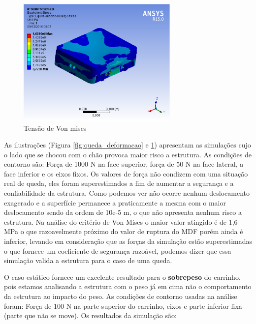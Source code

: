 \begin{figure}[H]
    \centering
    \includegraphics[width=0.7\textwidth]{figuras/queda_von.eps}
    \caption{Tensão de Von mises}
    \label{fig:queda_von}
\end{figure}

As ilustrações (Figura \ref{fig:queda_deformacao} e \ref{fig:queda_von}) apresentam as simulações cujo o lado que se chocou com o chão provoca
maior risco a estrutura. As condições de contorno são: Força de 1000 N na face superior, força de 50 N na face lateral, a face inferior e os
eixos fixos. Os valores de força não condizem com uma situação real de queda, eles foram superestimados a fim de aumentar a segurança e a
confiabilidade da estrutura. Como podemos ver não ocorre nenhum deslocamento exagerado e a superfície permanece a praticamente a mesma com
o maior deslocamento sendo da ordem de 10e-5 m, o que não apresenta nenhum risco a estrutura. Na análise do critério de Von Mises o maior
valor atingido é de 1,6 MPa o que razoavelmente próximo do valor de ruptura do MDF porém ainda é inferior, levando em consideração que as
forças da simulação estão superestimadas o que fornece um coeficiente de segurança razoável, podemos dizer que essa simulação valida a
estrutura para o caso de uma queda.

O caso estático fornece um excelente resultado para o \textbf{sobrepeso} do carrinho, pois estamos analisando a estrutura com o peso já
em cima não o comportamento da estrutura ao impacto do peso. As condições de contorno usadas na análise foram: Força de 100 N na parte
superior do carrinho, eixos e parte inferior fixa (parte que não se move). Os resultados da simulação são:

